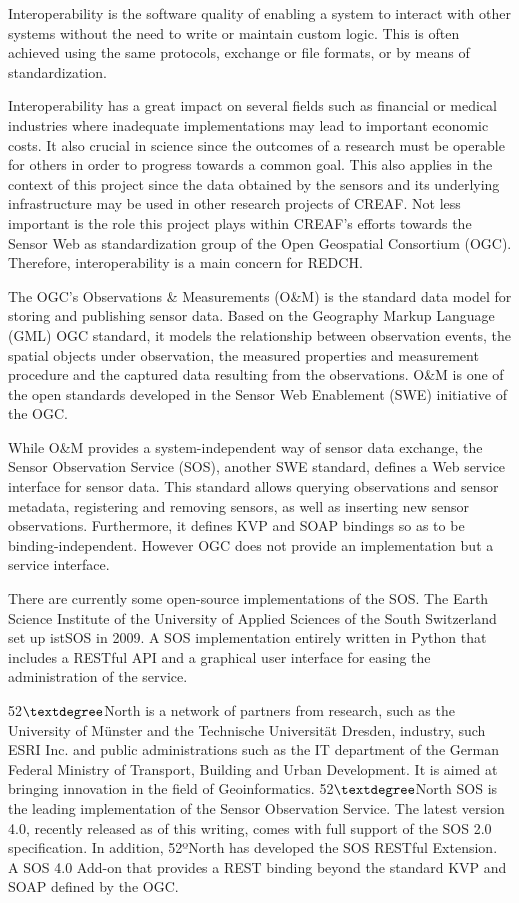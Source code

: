 Interoperability is the software quality of enabling a system to interact with other systems without the need to write or maintain custom logic. This is often achieved using the same protocols, exchange or file formats, or by means of standardization.

Interoperability has a great impact on several fields such as financial or medical industries where inadequate implementations may lead to important economic costs. It also crucial in science since the outcomes of a research must be operable for others in order to progress towards a common goal. This also applies in the context of this project since the data obtained by the sensors and its underlying infrastructure may be used in other research projects of CREAF. Not less important is the role this project plays within CREAF's efforts towards the Sensor Web \cite{SWE} as standardization group of the Open Geospatial Consortium (OGC). Therefore, interoperability is a main concern for REDCH.

The OGC's Observations \& Measurements (O\&M) \cite{OM} is the standard data model for storing and publishing sensor data. Based on the Geography Markup Language (GML) OGC standard, it models the relationship between observation events, the spatial objects under observation, the measured properties and measurement procedure and the captured data resulting from the observations. O\&M is one of the open standards developed in the Sensor Web Enablement (SWE) initiative of the OGC.

While O\&M provides a system-independent way of sensor data exchange, the Sensor Observation Service (SOS), another SWE standard, defines a Web service interface for sensor data. This standard allows querying observations and sensor metadata, registering and removing sensors, as well as inserting new sensor observations. Furthermore, it defines KVP and SOAP bindings so as to be binding-independent. However OGC does not provide an implementation but a service interface.

There are currently some open-source implementations of the SOS. The Earth Science Institute of the University of Applied Sciences of the South Switzerland set up istSOS \cite{istSOS} in 2009. A SOS implementation entirely written in Python that includes a RESTful API and a graphical user interface for easing the administration of the service.

52$\textdegree$North is a network of partners from research, such as the University of Münster and the Technische Universität Dresden, industry, such ESRI Inc. and public administrations such as the IT department of the German Federal Ministry of Transport, Building and Urban Development. It is aimed at bringing innovation in the field of Geoinformatics. 52$\textdegree$North SOS \cite{52north-SOS} is the leading implementation of the Sensor Observation Service. The latest version 4.0, recently released as of this writing, comes with full support of the SOS 2.0 specification. In addition, 52ºNorth has developed the SOS RESTful Extension. A SOS 4.0 Add-on that provides a REST binding beyond the standard KVP and SOAP defined by the OGC.

